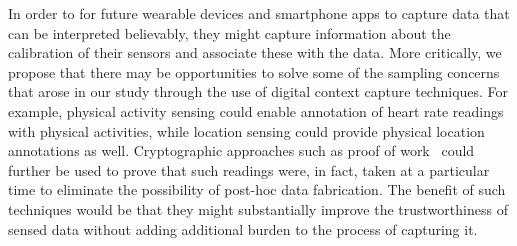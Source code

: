\documentclass{sigchi}
\begin{document}
In order to for future wearable devices and smartphone apps to capture data that can be interpreted believably, they might capture information about the calibration of their sensors and associate these with the data.   More critically, we propose that there may be opportunities to solve some of the sampling concerns that arose in our study through the use of digital context capture techniques.  For example, physical activity sensing could enable annotation of heart rate readings with physical activities, while location sensing could provide physical location annotations as well.  Cryptographic approaches such as proof of work~\cite{clark2012commitcoin} could further be used to prove that such readings were, in fact, taken at a particular time to eliminate the possibility of post-hoc data fabrication.  The benefit of such techniques would be that they might substantially improve the trustworthiness of sensed data without adding additional burden to the process of capturing it.





\end{document}
